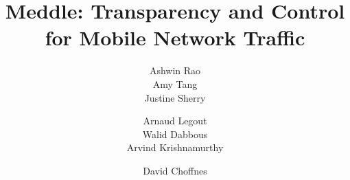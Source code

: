 \documentclass{sig-alternate-10pt}
\title{Meddle: Transparency and Control for Mobile Network Traffic}
\author{
\alignauthor
Ashwin Rao\\
\affaddr{Inria}
\alignauthor
Amy Tang\\
\affaddr{UC Berkeley}
\alignauthor        
Justine Sherry\\
\affaddr{UC Berkeley}
\and
\alignauthor
Arnaud Legout\\
\affaddr{Inria}
\alignauthor
Walid Dabbous\\
\affaddr{Inria}
\alignauthor 
Arvind Krishnamurthy\\
\affaddr{University of Washington}
\and
\alignauthor
David Choffnes\\
\affaddr{University of Washington}
}
\date{}
\begin{document}
	
\maketitle




















\footnotesize


%
\end{document}

